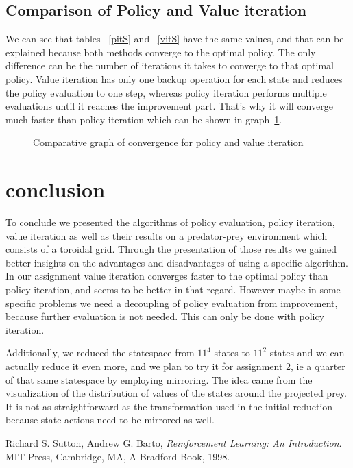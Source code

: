 \documentclass[paper=a4, fontsize=11pt]{scrartcl}
\numberwithin{equation}{section}		%
\numberwithin{figure}{section}			%
\numberwithin{table}{section}				%
\begin{document}
\subsection{Comparison of Policy and Value iteration}
We can see that tables ~\ref{pitS}  and ~\ref{vitS} have the same values, and that can be explained because both methods converge to the optimal policy. The only difference can be the number of iterations it takes to converge to that optimal policy. Value iteration has only one backup operation for each state and reduces the policy evaluation to one step, whereas policy iteration performs multiple evaluations until it reaches the improvement part. That's why it will converge much faster than policy iteration which can be shown in graph~\ref{converge}. 

\begin{figure}[H] \centering
\caption{Comparative graph of convergence for policy and value iteration} \label{converge}
\end{figure}

\section{conclusion}
\label{discussion}
To conclude we presented the algorithms of policy evaluation, policy iteration, value iteration as well as their results on a predator-prey environment which consists of a toroidal grid. Through the presentation of those results we gained better insights on the advantages and disadvantages of using a specific algorithm. In our assignment value iteration converges faster to the optimal policy than policy iteration, and seems to be better in that regard. However maybe in some specific problems we need a decoupling of policy evaluation from improvement, because further evaluation is not needed. This can only be done with policy iteration.

Additionally, we reduced the statespace from $11^4$ states to $11^2$ states and we can actually reduce it even more, and we plan to try it for assignment 2, ie a quarter of that same statespace by employing mirroring. The idea came from the visualization of the distribution of values of the states around the projected prey. It is not as straightforward as the transformation used in the initial reduction because state actions need to be mirrored as well.




\begin{thebibliography}{9}

  Richard S. Sutton, Andrew G. Barto,
  \emph{Reinforcement Learning: An Introduction}.
  MIT Press, Cambridge, MA, 
  A Bradford Book,
  1998.

\end{thebibliography}

\end{document}
